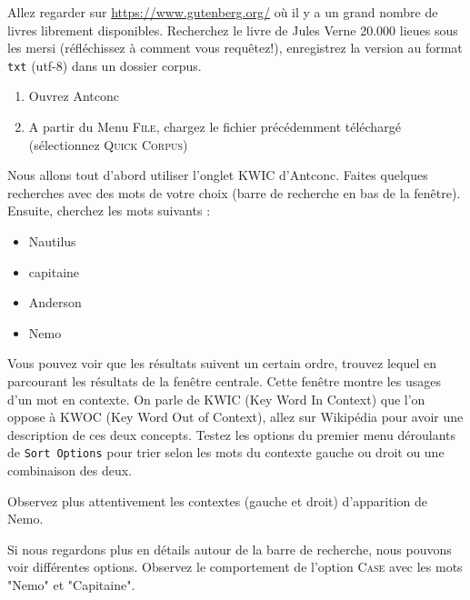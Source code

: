 


\vspace{.5cm}
\vspace{.5cm}


 Allez regarder sur \url{https://www.gutenberg.org/} où il y a un grand nombre de livres librement disponibles. 
 Recherchez le livre de Jules Verne 20.000 lieues sous les mersi (réfléchissez à comment vous requêtez!), enregistrez la version au format \texttt{txt} (utf-8) dans un dossier corpus.

\begin{enumerate}
\item Ouvrez Antconc %
\item A partir du Menu \textsc{File}, chargez le fichier précédemment téléchargé (sélectionnez \textsc{Quick Corpus})
\end{enumerate}

 Nous allons tout d'abord utiliser l'onglet \textsc{KWIC} d'Antconc.
 Faites quelques recherches avec des mots de votre choix (barre de recherche en bas de la fenêtre).
 Ensuite, cherchez les mots suivants :
\begin{itemize}
  \item Nautilus
  \item capitaine
  \item Anderson
  \item Nemo
\end{itemize}
 Vous pouvez voir que les résultats suivent un certain ordre, trouvez lequel en parcourant les résultats de la fenêtre centrale.
 Cette fenêtre montre les usages d'un mot en contexte.
 On parle de KWIC (Key Word In Context) que l'on oppose à KWOC (Key Word Out of Context), allez sur Wikipédia pour avoir une description de ces deux concepts.
 Testez les options du premier menu déroulants de \texttt{Sort Options} pour trier selon les mots du contexte gauche ou droit ou une combinaison des deux.

Observez plus attentivement les contextes (gauche et droit) d'apparition de Nemo. %

 Si nous regardons plus en détails autour de la barre de recherche, nous pouvons voir différentes options. Observez le comportement de l'option \textsc{Case} avec les mots "Nemo" et "Capitaine".

\vspace{.5cm}
\vspace{.5cm}

